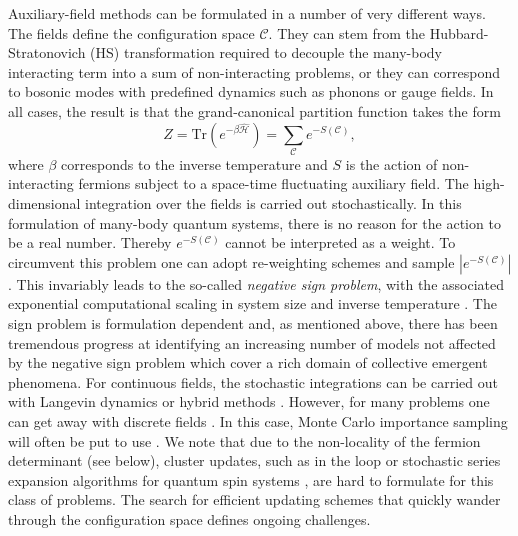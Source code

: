 Auxiliary-field methods  can be formulated in a number of very different ways.  The fields define  the  configuration space $\mathcal{C}$. They can stem from the Hubbard-Stratonovich (HS)  \cite{Hubbard59} transformation required to decouple the  many-body interacting term into a sum of non-interacting problems,  or they can correspond to  bosonic modes with predefined dynamics such as phonons or gauge fields. In all cases, the result is that  the grand-canonical partition function  takes the form
\begin{equation}
	 Z = \text{Tr}\left( e^{-\beta \hat{\mathcal{H}}}\right)   =   \sum_{\mathcal{C}} e^{-S(\mathcal{C}) },
\end{equation}
where $\beta $ corresponds to the inverse temperature and $S$  is the action of non-interacting fermions subject to a  space-time fluctuating auxiliary field.  
The high-dimensional  integration  over the fields is carried out stochastically.  In this formulation of many-body quantum systems, there is no reason for the action to be a real number.  Thereby $e^{-S(\mathcal{C})}$ cannot be interpreted as a weight. To circumvent this problem one can adopt   re-weighting schemes and sample $| e^{-S(\mathcal{C})}| $. This invariably leads to the so-called \emph{negative sign problem}, with the associated exponential computational scaling in system size and inverse temperature \cite{Troyer05}.  The sign problem is formulation dependent and, as mentioned above, there has been tremendous progress at identifying an increasing number of models not affected by the negative sign problem which cover a rich domain of collective emergent phenomena.  
For continuous fields, the stochastic integrations can  be carried out with Langevin  dynamics or hybrid methods \cite{Duane85}.   However, for many  problems one can get away with discrete fields \cite{Hirsch83}. In this case,  Monte Carlo importance sampling will often be put to use \cite{Sokal89}.  
We note that  due to  the non-locality of the fermion determinant (see below), cluster updates,  such as in the loop or stochastic series expansion algorithms for quantum spin systems  \cite{Evertz93,Sandvik99b,Sandvik02}, are hard to formulate for this class of problems.  The search for efficient updating schemes that quickly wander through the configuration space defines ongoing challenges. 

